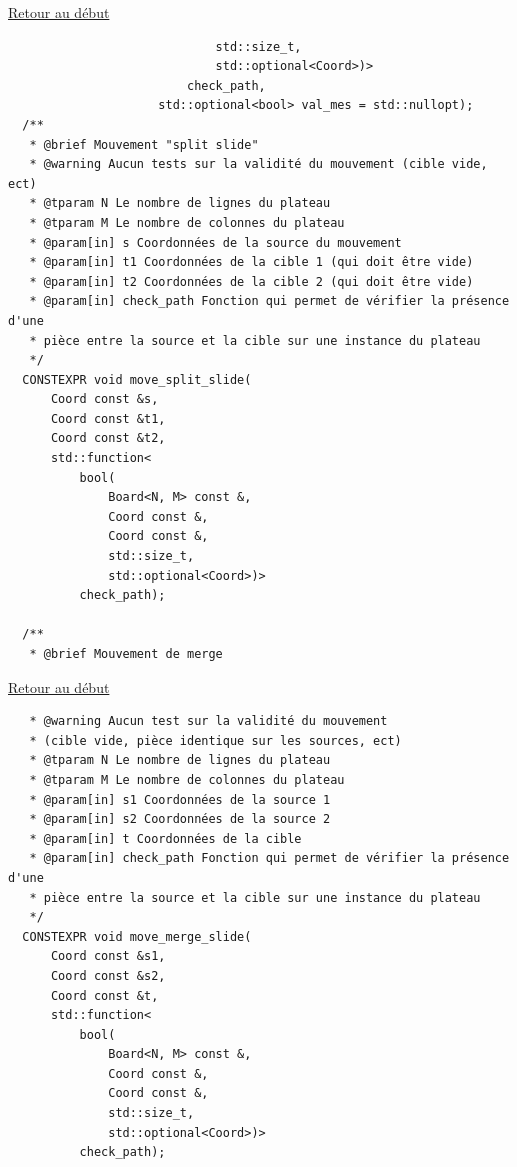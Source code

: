 {\begin{frame}[fragile]
\hyperlink{conclusion}{Retour au début}\newline
\begin{verbatim}
                             std::size_t,
                             std::optional<Coord>)>
                         check_path,
                     std::optional<bool> val_mes = std::nullopt);
  /**
   * @brief Mouvement "split slide"
   * @warning Aucun tests sur la validité du mouvement (cible vide, ect)
   * @tparam N Le nombre de lignes du plateau
   * @tparam M Le nombre de colonnes du plateau
   * @param[in] s Coordonnées de la source du mouvement
   * @param[in] t1 Coordonnées de la cible 1 (qui doit être vide)
   * @param[in] t2 Coordonnées de la cible 2 (qui doit être vide)
   * @param[in] check_path Fonction qui permet de vérifier la présence d'une
   * pièce entre la source et la cible sur une instance du plateau
   */
  CONSTEXPR void move_split_slide(
      Coord const &s,
      Coord const &t1,
      Coord const &t2,
      std::function<
          bool(
              Board<N, M> const &,
              Coord const &,
              Coord const &,
              std::size_t,
              std::optional<Coord>)>
          check_path);

  /**
   * @brief Mouvement de merge
\end{verbatim}
\end{frame}

\begin{frame}[fragile]
\hyperlink{conclusion}{Retour au début}\newline
\begin{verbatim}
   * @warning Aucun test sur la validité du mouvement
   * (cible vide, pièce identique sur les sources, ect)
   * @tparam N Le nombre de lignes du plateau
   * @tparam M Le nombre de colonnes du plateau
   * @param[in] s1 Coordonnées de la source 1
   * @param[in] s2 Coordonnées de la source 2
   * @param[in] t Coordonnées de la cible
   * @param[in] check_path Fonction qui permet de vérifier la présence d'une
   * pièce entre la source et la cible sur une instance du plateau
   */
  CONSTEXPR void move_merge_slide(
      Coord const &s1,
      Coord const &s2,
      Coord const &t,
      std::function<
          bool(
              Board<N, M> const &,
              Coord const &,
              Coord const &,
              std::size_t,
              std::optional<Coord>)>
          check_path);


\end{verbatim}
\end{frame}}
